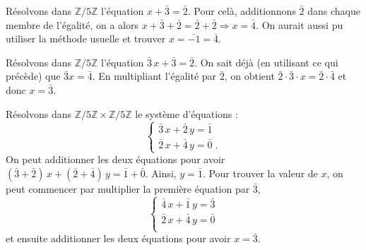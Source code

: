       \begin{ex}                  
            R\'esolvons dans $\mathbb{Z}/5\mathbb{Z}$ l'\'equation $x+\bar{3} = \bar{2}$.
            Pour cel\`a, additionnons $\bar{2}$ dans chaque membre de l'\'egalit\'e, on a alors 
                  $x + \bar{3} + \bar{2} = \bar{2} + \bar{2} \Rightarrow x = \bar{4}$.
            On aurait aussi pu utiliser la m\'ethode usuelle et trouver $ x = \bar{-1} = \bar{4}$.
            
            R\'esolvons dans $\mathbb{Z}/5\mathbb{Z}$ l'\'equation $\bar{3}\, x+\bar{3} = \bar{2}$.
            On sait d\'ej\`a (en utilisant ce qui pr\'ec\`ede) que $\bar{3} x = \bar{4}$.
            En multipliant l'\'egalit\'e par $\bar{2}$, on obtient 
                  $\bar{2} \cdot \bar{3} \cdot x = \bar{2} \cdot \bar{4}$
                  et donc $x = \bar{3}$.
            
            R\'esolvons dans $\mathbb{Z}/5\mathbb{Z} \times \mathbb{Z}/5\mathbb{Z}$ le syst\`eme d'\'equations :
            \[
            \left\lbrace
                  \begin{array}{l}
                        \bar{3}\, x + \bar{2}\, y = \bar{1} \\
                        \bar{2}\, x + \bar{4}\, y = \bar{0} \;.
                  \end{array}
            \right.
            \]
            On peut additionner les deux \'equations pour avoir 
                $ ( \bar{3} + \bar{2} ) \, x + ( \bar{2} + \bar{4} ) \, y = \bar{1} + \bar{0} $.
                Ainsi, $y = \bar{1}$.
            Pour trouver la valeur de $x$, on peut commencer par multiplier la premi\`ere \'equation par $\bar{3}$,
            \[
            \left\lbrace
                  \begin{array}{l}
                        \bar{4}\, x + \bar{1}\, y = \bar{3} \\
                        \bar{2}\, x + \bar{4}\, y = \bar{0} \\
                  \end{array}
            \right.
            \]
            et ensuite additionner les deux \'equations pour avoir 
                  $ x = \bar{3}$.            
      \end{ex}
